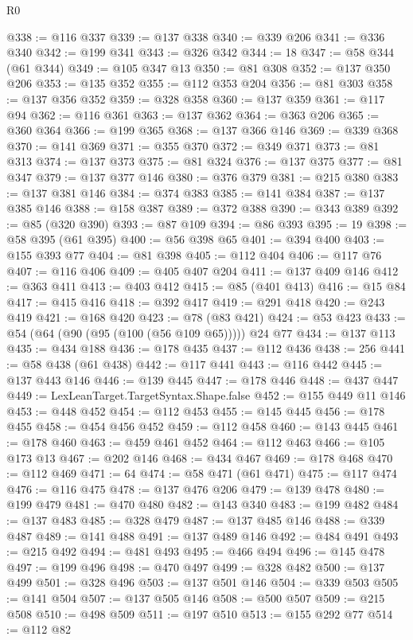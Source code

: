 \begin{lexlean}{R0}
\begin{coremodule}
@338 := @116 @337
@339 := @137 @338
@340 := @339 @206
@341 := @336 @340
@342 := @199 @341
@343 := @326 @342
@344 := 18
@347 := @58 @344 (@61 @344)
@349 := @105 @347 @13
@350 := @81 @308
@352 := @137 @350 @206
@353 := @135 @352
@355 := @112 @353 @204
@356 := @81 @303
@358 := @137 @356 @352
@359 := @328 @358
@360 := @137 @359
@361 := @117 @94
@362 := @116 @361
@363 := @137 @362
@364 := @363 @206
@365 := @360 @364
@366 := @199 @365
@368 := @137 @366 @146
@369 := @339 @368
@370 := @141 @369
@371 := @355 @370
@372 := @349 @371
@373 := @81 @313
@374 := @137 @373
@375 := @81 @324
@376 := @137 @375
@377 := @81 @347
@379 := @137 @377 @146
@380 := @376 @379
@381 := @215 @380
@383 := @137 @381 @146
@384 := @374 @383
@385 := @141 @384
@387 := @137 @385 @146
@388 := @158 @387
@389 := @372 @388
@390 := @343 @389
@392 := @85 (@320 @390)
@393 := @87 @109
@394 := @86 @393
@395 := 19
@398 := @58 @395 (@61 @395)
@400 := @56 @398 @65
@401 := @394 @400
@403 := @155 @393 @77
@404 := @81 @398
@405 := @112 @404
@406 := @117 @76
@407 := @116 @406
@409 := @405 @407 @204
@411 := @137 @409 @146
@412 := @363 @411
@413 := @403 @412
@415 := @85 (@401 @413)
@416 := @15 @84
@417 := @415 @416
@418 := @392 @417
@419 := @291 @418
@420 := @243 @419
@421 := @168 @420
@423 := @78 (@83 @421)
@424 := @53 @423
@433 := @54 (@64 (@90 (@95 (@100 (@56 @109 @65))))) @24 @77
@434 := @137 @113
@435 := @434 @188
@436 := @178 @435
@437 := @112 @436
@438 := 256
@441 := @58 @438 (@61 @438)
@442 := @117 @441
@443 := @116 @442
@445 := @137 @443 @146
@446 := @139 @445
@447 := @178 @446
@448 := @437 @447
@449 := LexLeanTarget.TargetSyntax.Shape.false
@452 := @155 @449 @11 @146
@453 := @448 @452
@454 := @112 @453
@455 := @145 @445
@456 := @178 @455
@458 := @454 @456 @452
@459 := @112 @458
@460 := @143 @445
@461 := @178 @460
@463 := @459 @461 @452
@464 := @112 @463
@466 := @105 @173 @13
@467 := @202 @146
@468 := @434 @467
@469 := @178 @468
@470 := @112 @469
@471 := 64
@474 := @58 @471 (@61 @471)
@475 := @117 @474
@476 := @116 @475
@478 := @137 @476 @206
@479 := @139 @478
@480 := @199 @479
@481 := @470 @480
@482 := @143 @340
@483 := @199 @482
@484 := @137 @483
@485 := @328 @479
@487 := @137 @485 @146
@488 := @339 @487
@489 := @141 @488
@491 := @137 @489 @146
@492 := @484 @491
@493 := @215 @492
@494 := @481 @493
@495 := @466 @494
@496 := @145 @478
@497 := @199 @496
@498 := @470 @497
@499 := @328 @482
@500 := @137 @499
@501 := @328 @496
@503 := @137 @501 @146
@504 := @339 @503
@505 := @141 @504
@507 := @137 @505 @146
@508 := @500 @507
@509 := @215 @508
@510 := @498 @509
@511 := @197 @510
@513 := @155 @292 @77
@514 := @112 @82

\end{coremodule}
\end{lexlean}
